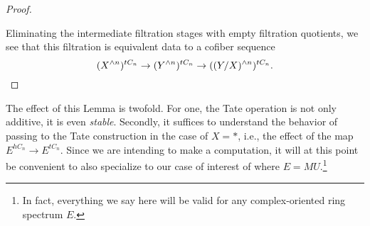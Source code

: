 \begin{proof}
\begin{center}
\end{center}
Eliminating the intermediate filtration stages with empty filtration quotients, we see that this filtration is equivalent data to a cofiber sequence \[(X^{\wedge n})^{tC_n} \to (Y^{\wedge n})^{tC_n} \to ((Y/X)^{\wedge n})^{tC_n}. \qedhere\]
\end{proof}

The effect of this Lemma is twofold.  For one, the Tate operation is not only additive, it is even \emph{stable}.  Secondly, it suffices to understand the behavior of passing to the Tate construction in the case of $X = *$, i.e., the effect of the map $E^{hC_n} \to E^{tC_n}$.  Since we are intending to make a computation, it will at this point be convenient to also specialize to our case of interest of where $E = MU$.\footnote{In fact, everything we say here will be valid for any complex-oriented ring spectrum $E$.}

